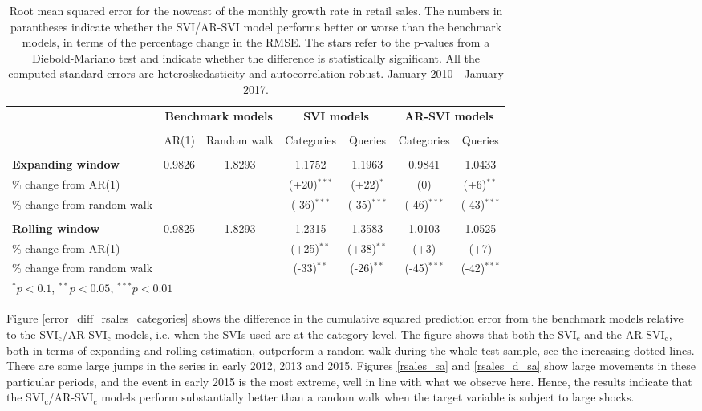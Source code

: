 \begin{table}[H]
\center
\scriptsize
\begin{tabular}{@{\extracolsep{4pt}}lcccccc@{}}
\toprule
						& \multicolumn{2}{c}{\textbf{Benchmark models}} & \multicolumn{2}{c}{\textbf{SVI models}} & \multicolumn{2}{c}{\textbf{AR-SVI models}} \\
 \cline{2-3} \cline{4-5}  \cline{6-7} \\ [-1.5ex]
								& AR(1) 			& Random walk 		& Categories 		& Queries 		& Categories 		& Queries \\ \\
\textbf{Expanding window} 		& 0.9826 		& 1.8293	 		& 1.1752				& 1.1963 		& 0.9841			& 1.0433 \\
\% change from AR(1) 			& 				& 					& (+20)$^{***}$ 		& (+22)$^{*}$ 	& (0) 				& (+6)$^{**}$ \\
\% change from random walk 		& 				& 					& (-36)$^{***}$ 		& (-35)$^{***}$ 	& (-46)$^{***}$		& (-43)$^{***}$ \\ \\
			
\textbf{Rolling window} 			& 0.9825 		& 1.8293 			& 1.2315 			& 1.3583 		& 1.0103 			& 1.0525 \\
\% change from AR(1) 			& 				& 					& (+25)$^{**}$		& (+38)$^{**}$ 	& (+3) 				& (+7) \\
\% change from random walk 		& 				& 					& (-33)$^{**}$ 		& (-26)$^{**}$ 	& (-45)$^{***}$ 		& (-42)$^{***}$ \\			
\bottomrule
\multicolumn{7}{l}{$^{*}p < 0.1$, $^{**}p < 0.05$, $^{***}p < 0.01$} \\
\end{tabular}
\caption{Root mean squared error for the nowcast of the monthly growth rate in retail sales. The numbers in parantheses indicate whether the SVI/AR-SVI model performs better or worse than the benchmark models, in terms of the percentage change in the RMSE. The stars refer to the p-values from a Diebold-Mariano test and indicate whether the difference is statistically significant. All the computed standard errors are heteroskedasticity and autocorrelation robust. January 2010 - January 2017.}
\label{rmse_rsales}
\end{table}
Figure \ref{error_diff_rsales_categories} shows the difference in the cumulative squared prediction error from the benchmark models relative to the SVI$_\text{c}$/AR-SVI$_\text{c}$ models, i.e. when the SVIs used are at the category level. The figure shows that both the SVI$_\text{c}$ and the AR-SVI$_\text{c}$, both in terms of expanding and rolling estimation, outperform a random walk during the whole test sample, see the increasing dotted lines. There are some large jumps in the series in early 2012, 2013 and 2015. Figures \ref{rsales_sa} and \ref{rsales_d_sa} show large movements in these particular periods, and the event in early 2015 is the most extreme, well in line with what we observe here. Hence, the results indicate that the SVI$_\text{c}$/AR-SVI$_\text{c}$ models perform substantially better than a random walk when the target variable is subject to large shocks.

